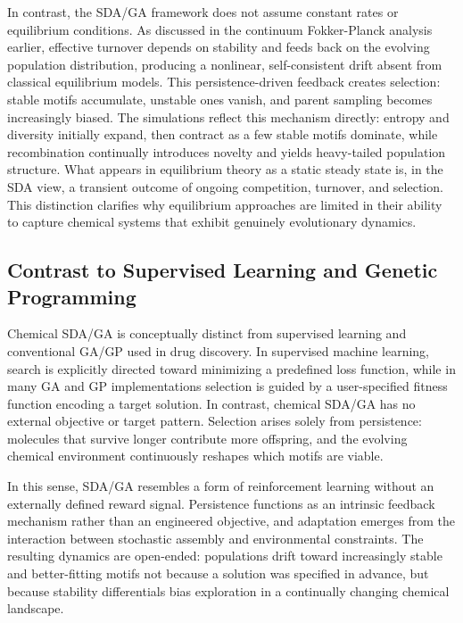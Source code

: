 \documentclass{artificial-life}
\begin{document}
In contrast, the SDA/GA framework does not assume constant rates or equilibrium conditions. As discussed in the continuum Fokker-Planck analysis earlier, effective turnover depends on stability and feeds back on the evolving population distribution, producing a nonlinear, self-consistent drift absent from classical equilibrium models. This persistence-driven feedback creates selection: stable motifs accumulate, unstable ones vanish, and parent sampling becomes increasingly biased. The simulations reflect this mechanism directly: entropy and diversity initially expand, then contract as a few stable motifs dominate, while recombination continually introduces novelty and yields heavy-tailed population structure. What appears in equilibrium theory as a static steady state is, in the SDA view, a transient outcome of ongoing competition, turnover, and selection. This distinction clarifies why equilibrium approaches are limited in their ability to capture chemical systems that exhibit genuinely evolutionary dynamics.



\subsection{Contrast to Supervised Learning and Genetic Programming}

Chemical SDA/GA is conceptually distinct from supervised learning and conventional GA/GP used in drug discovery. In supervised machine learning, search is explicitly directed toward minimizing a predefined loss function, while in many GA and GP implementations selection is guided by a user-specified fitness function encoding a target solution. In contrast, chemical SDA/GA has no external objective or target pattern. Selection arises solely from persistence: molecules that survive longer contribute more offspring, and the evolving chemical environment continuously reshapes which motifs are viable.

In this sense, SDA/GA resembles a form of reinforcement learning without an externally defined reward signal. Persistence functions as an intrinsic feedback mechanism rather than an engineered objective, and adaptation emerges from the interaction between stochastic assembly and environmental constraints. The resulting dynamics are open-ended: populations drift toward increasingly stable and better-fitting motifs not because a solution was specified in advance, but because stability differentials bias exploration in a continually changing chemical landscape.
\end{document}
